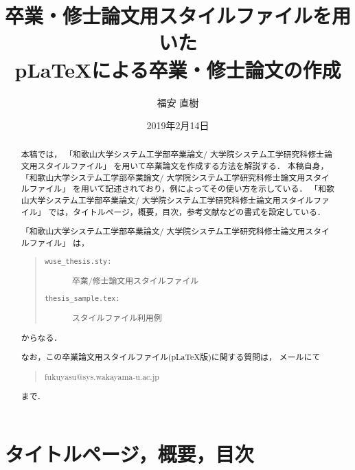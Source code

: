 \documentclass[11pt]{jreport}
\title{卒業・修士論文用スタイルファイルを用いた\\
       p\LaTeX による卒業・修士論文の作成}
\author{福安 直樹}
\date{2019年2月14日}	%
\begin{document}
\maketitle

\begin{abstract}
本稿では，
「和歌山大学システム工学部卒業論文/
  大学院システム工学研究科修士論文用スタイルファイル」
を用いて卒業論文を作成する方法を解説する．
本稿自身，
「和歌山大学システム工学部卒業論文/
  大学院システム工学研究科修士論文用スタイルファイル」
を用いて記述されており，例によってその使い方を示している．
「和歌山大学システム工学部卒業論文/
  大学院システム工学研究科修士論文用スタイルファイル」
では，タイトルページ，概要，目次，参考文献などの書式を設定している．

「和歌山大学システム工学部卒業論文/
  大学院システム工学研究科修士論文用スタイルファイル」
は，
\begin{quote}
  \begin{description}
    \item[\tt wuse\_thesis.sty:] 卒業/修士論文用スタイルファイル
    \item[\tt thesis\_sample.tex:] スタイルファイル利用例
  \end{description}
\end{quote}
からなる．

なお，この卒業論文用スタイルファイル(p\LaTeX 版)に関する質問は，
メールにて
\begin{quote}
fukuyasu@sys.wakayama-u.ac.jp
\end{quote}
まで．

\end{abstract}

\tableofcontents



\newpage
{}	%



\chapter{タイトルページ，概要，目次}
\end{document}
